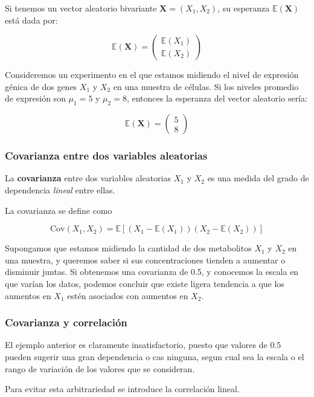 \documentclass[
]{article}
\begin{document}
Si tenemos un vector aleatorio bivariante \(\mathbf{X}=(X_1,X_2)\), su esperanza \(\mathbb{E}(\mathbf{X})\) está dada por:

\[
\mathbb{E}(\mathbf{X})=
\begin{pmatrix}
\mathbb{E}(X_1)\\
\mathbb{E}(X_2)
\end{pmatrix}
\]

Consideremos un experimento en el que estamos midiendo el nivel de expresión génica de dos genes \(X_1\) y \(X_2\) en una muestra de células. Si los niveles promedio de expresión son \(\mu_1=5\) y \(\mu_2=8\), entonces la esperanza del vector aleatorio sería:

\[
\mathbb{E}(\mathbf{X})=
\begin{pmatrix}
5\\
8
\end{pmatrix}
\]

\subsubsection{Covarianza entre dos variables aleatorias}\label{covarianza-entre-dos-variables-aleatorias}

La \textbf{covarianza} entre dos variables aleatorias \(X_1\) y \(X_2\) es una medida del grado de dependencia \emph{lineal} entre ellas.

La covarianza se define como

\[
\text{Cov}(X_1,X_2)=\mathbb{E}[(X_1-\mathbb{E}(X_1))(X_2-\mathbb{E}(X_2))]
\]

Supongamos que estamos midiendo la cantidad de dos metabolitos \(X_1\) y \(X_2\) en una muestra, y queremos saber si sus concentraciones tienden a aumentar o disminuir juntas. Si obtenemos una covarianza de 0.5, y conocemos la escala en que varían los datos, podemos concluir que existe ligera tendencia a que los aumentos en \(X_1\) estén asociados con aumentos en \(X_2\).

\subsubsection{Covarianza y correlación}\label{covarianza-y-correlaciuxf3n}

El ejemplo anterior es claramente insatisfactorio, puesto que valores de 0.5 pueden sugerir una gran dependencia o cas ninguna, segun cual sea la escala o el rango de variación de los valores que se consideran.

Para evitar esta arbitrariedad se introduce la correlación lineal.
\end{document}
